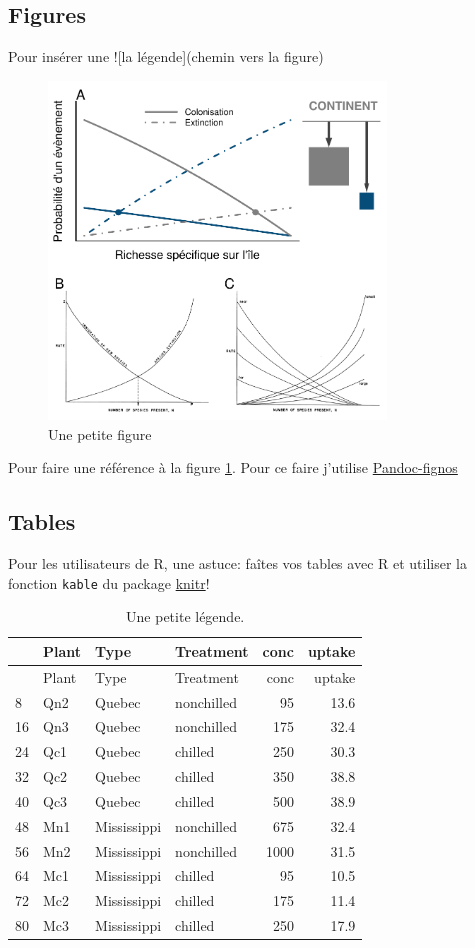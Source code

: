 \subsection*{Figures}\label{figures}

Pour insérer une !{[}la légende{]}(chemin vers la figure)

\begin{figure}[htbp]
\centering
\includegraphics[width=0.80000\textwidth]{fig/fig1.pdf}
\caption{Une petite figure\label{fig:intr1}}
\end{figure}

Pour faire une référence à la figure \ref{fig:intr1}. Pour ce faire
j'utilise \href{https://github.com/tomduck/pandoc-fignos}{Pandoc-fignos}

\subsection*{Tables}\label{tables}

Pour les utilisateurs de R, une astuce: faîtes vos tables avec R et
utiliser la fonction \texttt{kable} du package
\href{http://yihui.name/knitr/}{knitr}!

\begin{longtable}[]{@{}llllrr@{}}
\caption{Une petite légende. \label{tbl:intr_1}}\tabularnewline
\toprule
& Plant & Type & Treatment & conc & uptake\tabularnewline
\midrule
\endfirsthead
\toprule
& Plant & Type & Treatment & conc & uptake\tabularnewline
\midrule
\endhead
8 & Qn2 & Quebec & nonchilled & 95 & 13.6\tabularnewline
16 & Qn3 & Quebec & nonchilled & 175 & 32.4\tabularnewline
24 & Qc1 & Quebec & chilled & 250 & 30.3\tabularnewline
32 & Qc2 & Quebec & chilled & 350 & 38.8\tabularnewline
40 & Qc3 & Quebec & chilled & 500 & 38.9\tabularnewline
48 & Mn1 & Mississippi & nonchilled & 675 & 32.4\tabularnewline
56 & Mn2 & Mississippi & nonchilled & 1000 & 31.5\tabularnewline
64 & Mc1 & Mississippi & chilled & 95 & 10.5\tabularnewline
72 & Mc2 & Mississippi & chilled & 175 & 11.4\tabularnewline
80 & Mc3 & Mississippi & chilled & 250 & 17.9\tabularnewline
\bottomrule
\end{longtable}


